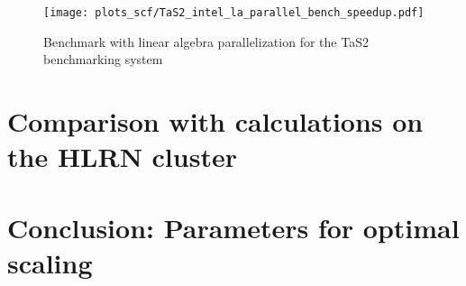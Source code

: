\documentclass[main.tex]{subfiles}
\begin{document}
\begin{figure}[ht!]
    \centering
    \texttt{[image: plots\_scf/TaS2\_intel\_la\_parallel\_bench\_speedup.pdf]}
    \caption{Benchmark with linear algebra parallelization for the TaS2 benchmarking system}
    \label{fig:scaling_nd_tas2}
\end{figure}


\section{Comparison with calculations on the HLRN cluster}

\section{Conclusion: Parameters for optimal scaling}
\end{document}
